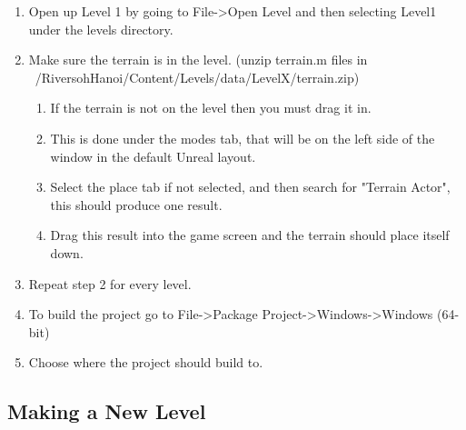 \begin{appendices}
\begin{enumerate}
	\item Open up Level 1 by going to File->Open Level   and then selecting Level1 under the levels directory.
	\item Make sure the terrain is in the level. (unzip terrain.m files in ~/RiversohHanoi/Content/Levels/data/LevelX/terrain.zip)
	\begin{enumerate}
	    \item If the terrain is not on the level then you must drag it in.
		\item This is done under the modes tab, that will be on the left side of the window in the default Unreal layout.
		\item Select the place tab if not selected, and then search for "Terrain Actor", this should produce one result.
		\item Drag this result into the game screen and the terrain should place itself down.
	\end{enumerate}
	\item Repeat step 2 for every level.
	\item To build the project go to File->Package Project->Windows->Windows (64-bit)
	\item Choose where the project should build to.
\end{enumerate}

\subsection{Making a New Level}


\end{appendices}
